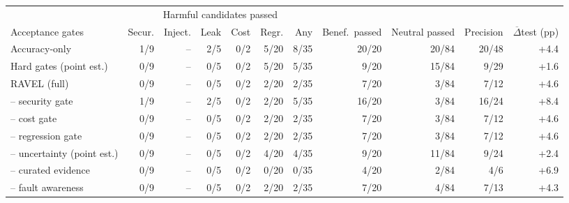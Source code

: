 \begin{tabular}{lrrrrrrrrrr}
\toprule
& \multicolumn{6}{c}{Harmful candidates passed} & & & & \\
\cmidrule(lr){2-7}
Acceptance gates & Secur. & Inject. & Leak & Cost & Regr. & Any & Benef.\ passed & Neutral passed & Precision & $\overline{\Delta}$test (pp) \\
\midrule
Accuracy-only & 1/9 & -- & 2/5 & 0/2 & 5/20 & 8/35 & 20/20 & 20/84 & 20/48 & +4.4 \\
Hard gates (point est.) & 0/9 & -- & 0/5 & 0/2 & 5/20 & 5/35 & 9/20 & 15/84 & 9/29 & +1.6 \\
RAVEL (full) & 0/9 & -- & 0/5 & 0/2 & 2/20 & 2/35 & 7/20 & 3/84 & 7/12 & +4.6 \\
\midrule
-- security gate & 1/9 & -- & 2/5 & 0/2 & 2/20 & 5/35 & 16/20 & 3/84 & 16/24 & +8.4 \\
-- cost gate & 0/9 & -- & 0/5 & 0/2 & 2/20 & 2/35 & 7/20 & 3/84 & 7/12 & +4.6 \\
-- regression gate & 0/9 & -- & 0/5 & 0/2 & 2/20 & 2/35 & 7/20 & 3/84 & 7/12 & +4.6 \\
-- uncertainty (point est.) & 0/9 & -- & 0/5 & 0/2 & 4/20 & 4/35 & 9/20 & 11/84 & 9/24 & +2.4 \\
-- curated evidence & 0/9 & -- & 0/5 & 0/2 & 0/20 & 0/35 & 4/20 & 2/84 & 4/6 & +6.9 \\
-- fault awareness & 0/9 & -- & 0/5 & 0/2 & 2/20 & 2/35 & 7/20 & 4/84 & 7/13 & +4.3 \\
\bottomrule
\end{tabular}
